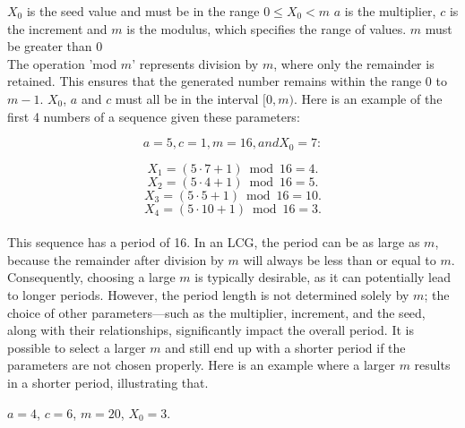 \noindent $X_0$ is the seed value and must be in the range $0 \leq X_0 < m$ \newline
$a$ is the multiplier,\newline 
$c$ is the increment and \newline
$m$ is the modulus, which specifies the range of values. $m$ must be greater than 0 \newline
\\
\noindent The operation 'mod $m$' represents division by $m$, where only the remainder
is retained. This ensures that the generated number remains within the range
0 to $m-1$.  $X_0$, $a$ and $c$ must all be in the interval $[0, m)$. 
Here is an example of the first 4 numbers of a sequence given these parameters: \newline

\begin{equation}
	a = 5, c = 1, m = 16, and X_0 = 7:
\end{equation}

\begin{equation}
	 X_1 = (5 \cdot 7 + 1)\bmod 16 = 4.
\end{equation}
\begin{equation} 
	X_2 = (5 \cdot 4 + 1) \bmod 16 = 5. 
\end{equation}
\begin{equation} X_3 = (5 \cdot 5 + 1) \bmod 16 = 10. \end{equation}
\begin{equation} X_4 = (5 \cdot 10 + 1) \bmod 16 = 3. \end{equation}
\\
\noindent This sequence has a period of 16. In an LCG, the period can be as large as $m$,
because the remainder after division by $m$ will always be less than or equal to
$m$. Consequently, choosing a large $m$ is typically desirable, as it can potentially
lead to longer periods. However, the period length is not determined solely by
$m$; the choice of other parameters—such as the multiplier, increment, and the
seed, along with their relationships, significantly impact the overall period. It
is possible to select a larger $m$ and still end up with a shorter period if the parameters are not chosen properly. Here is an example where a larger $m$ results in a shorter period, illustrating that.

\begin{center}
	$a=4$, $c=6$, $m=20$, $X_0=3.$
\end{center}

